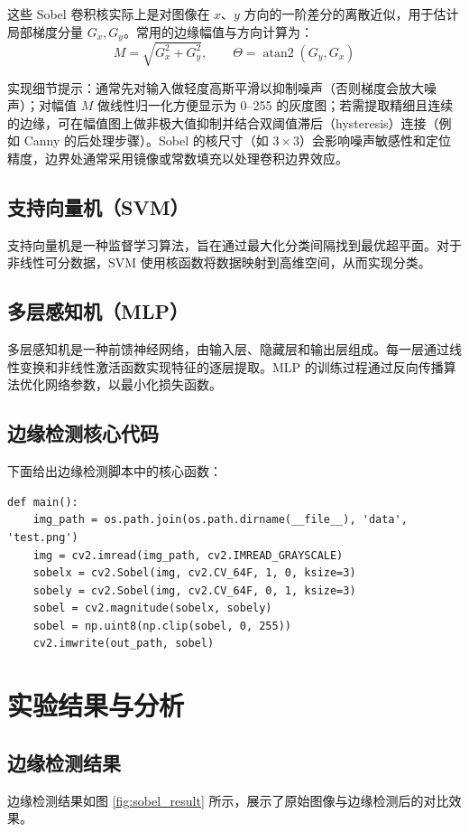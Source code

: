这些 Sobel 卷积核实际上是对图像在 $x$、$y$ 方向的一阶差分的离散近似，用于估计局部梯度分量 $G_x, G_y$。常用的边缘幅值与方向计算为：
\begin{equation}
M = \sqrt{G_x^2 + G_y^2},\qquad
\Theta = \operatorname{atan2}(G_y, G_x)
\end{equation}

实现细节提示：通常先对输入做轻度高斯平滑以抑制噪声（否则梯度会放大噪声）；对幅值 $M$ 做线性归一化方便显示为 0--255 的灰度图；若需提取精细且连续的边缘，可在幅值图上做非极大值抑制并结合双阈值滞后（hysteresis）连接（例如 Canny 的后处理步骤）。Sobel 的核尺寸（如 $3\times3$）会影响噪声敏感性和定位精度，边界处通常采用镜像或常数填充以处理卷积边界效应。

\subsection{支持向量机（SVM）}
支持向量机是一种监督学习算法，旨在通过最大化分类间隔找到最优超平面。对于非线性可分数据，SVM 使用核函数将数据映射到高维空间，从而实现分类。

\subsection{多层感知机（MLP）}
多层感知机是一种前馈神经网络，由输入层、隐藏层和输出层组成。每一层通过线性变换和非线性激活函数实现特征的逐层提取。MLP 的训练过程通过反向传播算法优化网络参数，以最小化损失函数。

\subsection{边缘检测核心代码}
下面给出边缘检测脚本中的核心函数：
\begin{lstlisting}[style=cleanpython]
def main():
    img_path = os.path.join(os.path.dirname(__file__), 'data', 'test.png')
    img = cv2.imread(img_path, cv2.IMREAD_GRAYSCALE)
    sobelx = cv2.Sobel(img, cv2.CV_64F, 1, 0, ksize=3)
    sobely = cv2.Sobel(img, cv2.CV_64F, 0, 1, ksize=3)
    sobel = cv2.magnitude(sobelx, sobely)
    sobel = np.uint8(np.clip(sobel, 0, 255))
    cv2.imwrite(out_path, sobel)
\end{lstlisting}


\section{实验结果与分析}
\subsection{边缘检测结果}
边缘检测结果如图 \ref{fig:sobel_result} 所示，展示了原始图像与边缘检测后的对比效果。

